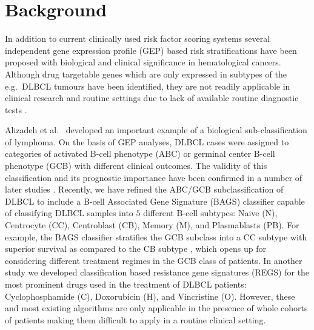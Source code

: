 \documentclass[twocolumn]{bmcart}%
\begin{document}




\section{Background}
In addition to current clinically used risk factor scoring systems several independent gene expression profile (GEP) based risk stratifications have been proposed with biological and clinical significance in hematological cancers.
Although drug targetable genes which are only expressed in subtypes of the e.g.\ DLBCL tumours have been identified, they are not readily applicable in clinical research and routine settings due to lack of available routine diagnostic tests \cite{Jaffe2009, Sehn2014}.

Alizadeh et al.~\cite{Alizadeh2000} developed an important example of a biological sub-classification of lymphoma.
On the basis of GEP analyses, DLBCL cases were assigned to categories of activated B-cell phenotype (ABC) or germinal center B-cell phenotype (GCB) with different clinical outcomes.
The validity of this classification and its prognostic importance have been confirmed in a number of later studies \cite{Rosenwald2002a,Hans2004,Poulsen2005,Lenz2008a,Monti2012a}.
Recently, we have refined the ABC/GCB subclassification of DLBCL to include a B-cell Associated Gene Signature (BAGS) classifier \cite{DybkaerBoegsted2015} capable of classifying DLBCL samples into $5$ different B-cell subtypes:
Naive (N), Centrocyte (CC), Centroblast (CB), Memory (M), and Plasmablasts (PB).
For example, the BAGS classifier stratifies the GCB subclass into a CC subtype with superior survival as compared to the CB subtype \cite{DybkaerBoegsted2015}, which opens up for considering different treatment regimes in the GCB class of patients.
In another study \cite{Falgreen2015} we developed classification based resistance gene signatures (REGS) for the most prominent drugs used in the treatment of DLBCL patients:
Cyclophosphamide (C), Doxorubicin (H), and Vincristine (O).
However, these and most existing algorithms are only applicable in the presence of whole cohorts of patients making them difficult to apply in a routine clinical setting.
\end{document}
